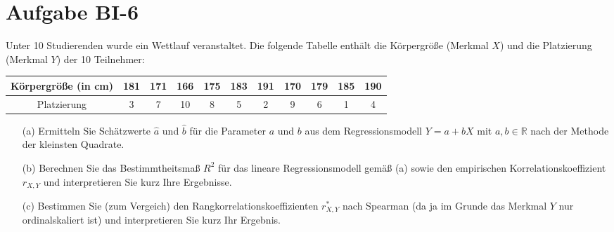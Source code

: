 
\section{Aufgabe BI-6}

\begin{task}
    Unter 10 Studierenden wurde ein Wettlauf veranstaltet. Die folgende Tabelle enthält die Körpergröße (Merkmal $X$) und die Platzierung (Merkmal $Y$) der 10 Teilnehmer:

    \begin{table}[H]
    \centering
    \begin{tabular}{c|cccccccccc}
        Körpergröße (in cm) & 181 & 171 & 166 & 175 & 183 &191 & 170 & 179 & 185 & 190 \\ \hline
        Platzierung & 3 & 7 & 10 & 8 & 5 & 2 & 9 & 6 & 1 & 4
    \end{tabular}
    \end{table}

    \begin{enumerate}
        \item[(a)] Ermitteln Sie Schätzwerte $\hat{a}$ und $\hat{b}$ für die Parameter $a$ und $b$ aus dem Regressionsmodell $Y=a+bX$ mit
        $a,b\in\mathbb{R}$
        nach der Methode der kleinsten Quadrate.
    \end{enumerate}
\end{task}

\begin{task}
    \begin{enumerate}
        \item[(b)] Berechnen Sie das Bestimmtheitsmaß $R^2$ für das lineare Regressionsmodell gemäß (a) sowie den empirischen Korrelationskoeffizient $r_{X,Y}$ und interpretieren Sie kurz Ihre Ergebnisse.
    \end{enumerate}
\end{task}

\begin{task}
    \begin{enumerate}
        \item[(c)] Bestimmen Sie (zum Vergeich) den Rangkorrelationskoeffizienten $r_{X,Y}^*$ nach Spearman (da ja im Grunde das Merkmal $Y$ nur ordinalskaliert ist) und interpretieren Sie kurz Ihr Ergebnis.
    \end{enumerate}
\end{task}
